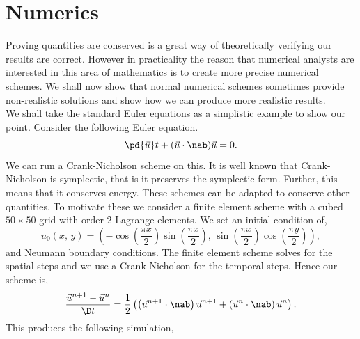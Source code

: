 
\section{Numerics}
Proving quantities are conserved is a great way of theoretically verifying our results are correct. However in practicality the reason that numerical analysts are interested in this area of mathematics is to create more precise numerical schemes. We shall now show that normal numerical schemes sometimes provide non-realistic solutions and show how we can produce more realistic results.\\

\noindent
We shall take the standard Euler equations as a simplistic example to show our point. Consider the following Euler equation.
$$ \pd {\vec u} t + ({\vec u} \cdot\nab){\vec u} = 0. $$
We can run a Crank-Nicholson scheme on this. It is well known that Crank-Nicholson is symplectic, that is it preserves the symplectic form. Further, this means that it conserves energy. These schemes can be adapted to conserve other quantities. To motivate these we consider a finite element scheme with a cubed $50\times 50$ grid with order $2$ Lagrange elements. We set an initial condition of,
$$ u_0(x,\, y) = \left( -\cos \left( \frac{\pi x}{2} \right)\sin \left( \frac{\pi x}{2} \right),\, \sin\left( \frac{\pi x}{2} \right)\cos \left( \frac{\pi y}{2} \right) \right), $$
and Neumann boundary conditions. The finite element scheme solves for the spatial steps and we use a Crank-Nicholson for the temporal steps. Hence our scheme is,
$$ \frac{{\vec u}^{n+1} - {\vec u}^n}{\D t} = \frac{1}{2}\left( \left({\vec u}^{n+1} \cdot \nab\right){\vec u}^{n+1} + \left({\vec u}^{n} \cdot \nab\right){\vec u}^{n}\right). $$
This produces the following simulation,
